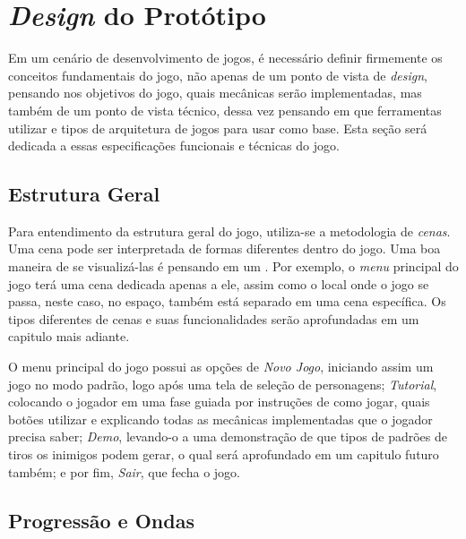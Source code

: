 \section{\textit{Design} do Protótipo}

Em um cenário de desenvolvimento de jogos, é necessário definir firmemente os conceitos fundamentais do jogo, não apenas de um ponto de vista de \textit{design}, pensando nos objetivos do jogo, quais mecânicas serão implementadas, mas também de um ponto de vista técnico, dessa vez pensando em que ferramentas utilizar e tipos de arquitetura de jogos para usar como base. Esta seção será dedicada a essas especificações funcionais e técnicas do jogo.

\subsection{Estrutura Geral}

Para entendimento da estrutura geral do jogo, utiliza-se a metodologia de \textit{cenas}\label{Cenas}. Uma cena pode ser interpretada de formas diferentes dentro do jogo. Uma boa maneira de se visualizá-las é pensando em um \textquotedbl{}. Por exemplo, o \textit{menu} principal do jogo terá uma cena dedicada apenas a ele, assim como o local onde o jogo se passa, neste caso, no espaço, também está separado em uma cena específica. Os tipos diferentes de cenas e suas funcionalidades serão aprofundadas em um capitulo mais adiante.

O menu principal do jogo possui as opções de \textit{Novo Jogo}, iniciando assim um jogo no modo padrão, logo após uma tela de seleção de personagens; \textit{Tutorial}, colocando o jogador em uma fase guiada por instruções de como jogar, quais botões utilizar e explicando todas as mecânicas implementadas que o jogador precisa saber; \textit{Demo}, levando-o a uma demonstração de que tipos de padrões de tiros os inimigos podem gerar, o qual será aprofundado em um capitulo futuro também; e por fim, \textit{Sair}, que fecha o jogo.

\subsection{Progressão e Ondas}\label{ONDASNOMAR}

